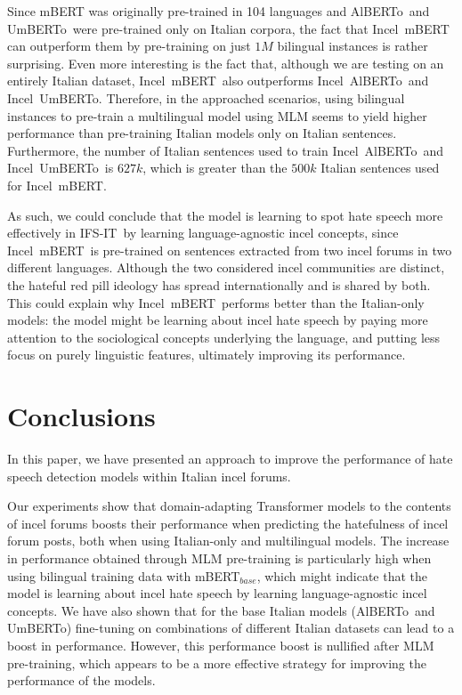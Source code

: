 \documentclass[11pt]{article}
\newcommand{\dsITclassification}{IFS-IT}
\newcommand{\mbert}{\mbox{mBERT$_{base}$}}
\newcommand{\imbert}{\mbox{Incel mBERT}}
\newcommand{\umbert}{\mbox{UmBERTo}}
\newcommand{\albert}{\mbox{AlBERTo}}
\newcommand{\iumbert}{\mbox{Incel UmBERTo}}
\newcommand{\ialbert}{\mbox{Incel AlBERTo}}
\begin{document}
Since mBERT was originally pre-trained in 104 languages and \albert\, and \umbert\, were pre-trained only on Italian corpora, the fact that \imbert\, can outperform them by pre-training on just $1M$ bilingual instances is rather surprising. Even more interesting is the fact that, although we are testing on an entirely Italian dataset, \imbert\, also outperforms \ialbert\, and \iumbert. Therefore, in the approached scenarios, using bilingual instances to pre-train a multilingual model using MLM seems to yield higher performance than pre-training Italian models only on Italian sentences. Furthermore, the number of Italian sentences used to train \ialbert\, and \iumbert\, is $627k$, which is greater than the $500k$ Italian sentences used for \imbert.

As such, we could conclude that the model is learning to spot hate speech more effectively in \dsITclassification\, by learning language-agnostic incel concepts, since \imbert\, is pre-trained on sentences extracted from two incel forums in two different languages. Although the two considered incel communities are distinct, the hateful red pill ideology has spread internationally and is shared by both. This could explain why \imbert\, performs better than the Italian-only models: the model might be learning about incel hate speech by paying more attention to the sociological concepts underlying the language, and putting less focus on purely linguistic features, ultimately improving its performance.


\section{Conclusions}

In this paper, we have presented an approach to improve the performance of hate speech detection models within Italian incel forums.

Our experiments show that domain-adapting Transformer models to the contents of incel forums boosts their performance when predicting the hatefulness of incel forum posts, both when using Italian-only and multilingual models. The increase in performance obtained through MLM pre-training is particularly high when using bilingual training data with \mbert, which might indicate that the model is learning about incel hate speech by learning language-agnostic incel concepts.
We have also shown that for the base Italian models (\albert\, and \umbert) fine-tuning on combinations of different Italian datasets can lead to a boost in performance. However, this performance boost is nullified after MLM pre-training, which appears to be a more effective strategy for improving the performance of the models.
\end{document}
